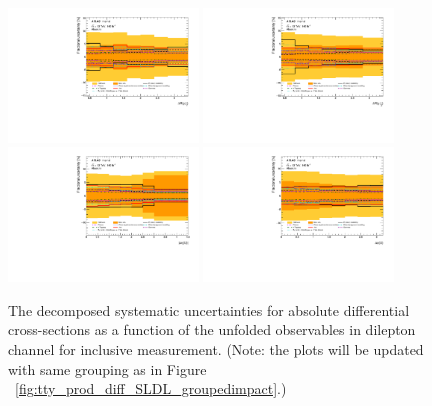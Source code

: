 \begin{figure}[ht]
  \centering
  \includegraphics[width=0.45\textwidth]{figures/diff_xsec/groupedimpact-absolute-xsec/tty_total_DL/Uncertainty_tty2l_dr1_all_syst.pdf}%
  \includegraphics[width=0.45\textwidth]{figures/diff_xsec/groupedimpact-absolute-xsec/tty_total_DL/Uncertainty_tty2l_dr2_all_syst.pdf}\\%
  \includegraphics[width=0.45\textwidth]{figures/diff_xsec/groupedimpact-absolute-xsec/tty_total_DL/Uncertainty_tty2l_dEtall_all_syst.pdf}%
  \includegraphics[width=0.45\textwidth]{figures/diff_xsec/groupedimpact-absolute-xsec/tty_total_DL/Uncertainty_tty2l_dPhill_all_syst.pdf}\\%
\caption{The decomposed systematic uncertainties for absolute differential cross-sections as a function of the unfolded observables in dilepton channel for inclusive \tty measurement.
 (Note: the plots will be updated with same grouping as in Figure ~\ref{fig:tty_prod_diff_SLDL_groupedimpact}.)}
\label{fig:tty_total_diff_DL2_groupedimpact}
\end{figure}
\FloatBarrier


